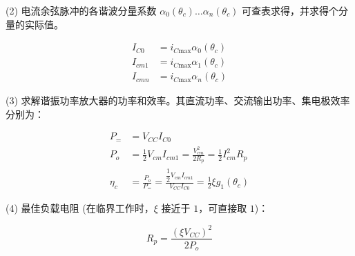 (2) 电流余弦脉冲的各谐波分量系数 $\alpha_0(\theta_c) \dots \alpha_n(\theta_c)$ 可查表求得，并求得个分量的实际值。

\begin{equation}
\begin{aligned}
    I_{C0}  &= i_{C \text{max}} \alpha_0(\theta_c) \\
    I_{cm1} &= i_{C \text{max}} \alpha_1(\theta_c) \\
    I_{cmn} &= i_{C \text{max}} \alpha_n(\theta_c) 
\end{aligned}
\end{equation}

(3) 求解谐振功率放大器的功率和效率。其直流功率、交流输出功率、集电极效率分别为：

\begin{equation}
\begin{aligned}
    P_= &= V_{CC} I_{C0} \\
    P_o &= \frac{1}{2} V_{cm} I_{cm1} = \frac{V_{cm}^2}{2R_p} = \frac{1}{2} I_{cm}^2 R_p \\
    \eta_c &= \frac{P_o}{P_=} = \frac{\dfrac{1}{2} V_{cm} I_{cm1}}{V_{CC} I_{C0}} = \frac{1}{2} \xi g_1(\theta_c)
\end{aligned}
\end{equation}

(4) 最佳负载电阻 (在临界工作时，$\xi$ 接近于 $1$，可直接取 $1$)：

\begin{equation}
    R_p = \frac{(\xi V_{CC})^2}{2 P_o}
\end{equation}


